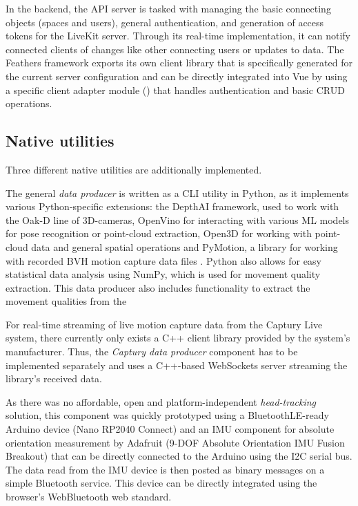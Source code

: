 In the backend, the \ac{API} server is tasked with managing the basic connecting objects (spaces and users), general authentication, and generation of access tokens for the LiveKit server.
Through its real-time implementation, it can notify connected clients of changes like other connecting users or updates to data.
The Feathers framework exports its own client library that is specifically generated for the current server configuration and can be directly integrated into Vue by using a specific client adapter module () that handles authentication and basic \ac{CRUD} operations.

\subsection{Native utilities}

Three different native utilities are additionally implemented.

The general \emph{data producer} is written as a \ac{CLI} utility in Python, as it implements various Python-specific extensions: the DepthAI framework, used to work with the Oak-D line of \ac{3D}-cameras, OpenVino for interacting with various \ac{ML} models for pose recognition or point-cloud extraction, Open3D \parencite{open3DZhou2018} for working with point-cloud data and general spatial operations and PyMotion, a library for working with recorded \ac{BVH} motion capture data files \parencite{githubPyMotion}.
Python also allows for easy statistical data analysis using NumPy, which is used for movement quality extraction.
This data producer also includes functionality to extract the movement qualities from the

For real-time streaming of live motion capture data from the Captury Live system, there currently only exists a C++ client library provided by the system's manufacturer.
Thus, the \emph{Captury data producer} component has to be implemented separately and uses a C++-based WebSockets server streaming the library's received data.

As there was no affordable, open and platform-independent \emph{head-tracking} solution, this component was quickly prototyped using a BluetoothLE-ready Arduino device (Nano RP2040 Connect) and an \ac{IMU} component for absolute orientation measurement by Adafruit (9-DOF Absolute Orientation IMU Fusion Breakout) that can be directly connected to the Arduino using the \ac{I2C} serial bus.
The data read from the \ac{IMU} device is then posted as binary messages on a simple Bluetooth service.
This device can be directly integrated using the browser's WebBluetooth web standard.

